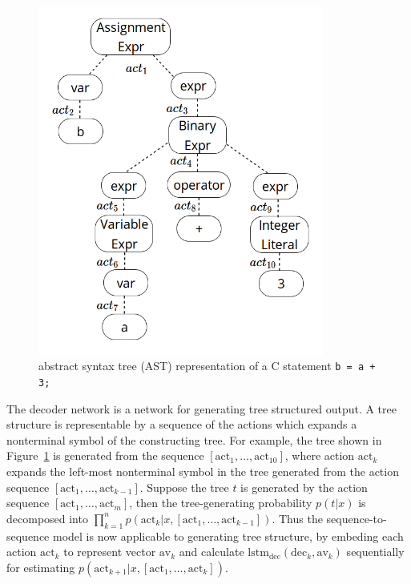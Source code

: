 \documentclass[senior,final,11pt]{iscs-thesis}
\begin{document}
\begin{figure}[]
	\begin{center}
	\includegraphics[height=11.5cm]{ast_zu.png}
	\end{center}
	\caption{abstract syntax tree (AST) representation of a C statement \texttt{b = a + 3;} }
	\label{fig:ast_zu}
\end{figure}

The decoder network is a network for generating tree structured output. 
A tree structure is representable by a sequence of the actions which expands a nonterminal symbol of the constructing tree.
For example, the tree shown in Figure~\ref{fig:ast_zu} is generated from the sequence $ [\mathrm{act}_1, \dots, \mathrm{act}_{10}] $, 
where action $ \mathrm{act}_k $ expands the left-most nonterminal symbol in the tree generated from the action sequence $ [\mathrm{act}_1, \dots, \mathrm{act}_{k-1}] $. 
Suppose the tree $t$ is generated by the action sequence $ [\mathrm{act}_1, \dots, \mathrm{act}_m] $, 
then the tree-generating probability $ p(t|x) $ is decomposed into $ \prod_{k=1}^n p(\mathrm{act}_k|x,[\mathrm{act}_1, \dots, \mathrm{act}_{k-1}]) $. 
Thus the sequence-to-sequence model is now applicable to generating tree structure, by embeding each action $\mathrm{act}_k$ to represent vector $\mathrm{av}_k$ and 
calculate $ \mathrm{lstm}_{\mathrm{dec}}(\mathrm{dec}_{k},\mathrm{av}_{k}) $ sequentially for estimating $p(\mathrm{act}_{k+1}|x,[\mathrm{act}_1, \dots, \mathrm{act}_{k}]) $.  
\end{document}
